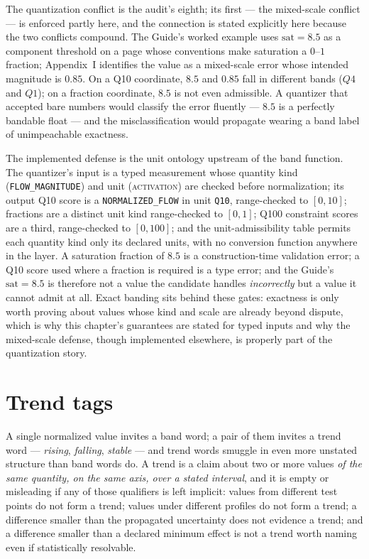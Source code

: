 The quantization conflict is the audit's eighth; its first --- the
mixed-scale conflict --- is enforced partly here, and the connection
is stated explicitly here because the two conflicts compound. The
Guide's worked example uses $\mathrm{sat} = 8.5$ as a component
threshold on a page whose conventions make saturation a $0$--$1$
fraction; Appendix~I identifies the value as a mixed-scale error whose
intended magnitude is $0.85$. On a Q10 coordinate, $8.5$ and $0.85$
fall in different bands ($Q4$ and $Q1$); on a fraction coordinate,
$8.5$ is not even admissible. A quantizer that accepted bare numbers
would classify the error fluently --- $8.5$ is a perfectly bandable
float --- and the misclassification would propagate wearing a band
label of unimpeachable exactness.

The implemented defense is the unit ontology upstream of the band
function. The quantizer's input is a typed measurement whose quantity
kind (\texttt{FLOW\_MAGNITUDE}) and unit (\textsc{activation}) are
checked before normalization; its output Q10 score is a
\texttt{NORMALIZED\_FLOW} in unit \texttt{Q10}, range-checked to
$[0, 10]$; fractions are a distinct unit kind range-checked to
$[0, 1]$; Q100 constraint scores are a third, range-checked to
$[0, 100]$; and the unit-admissibility table permits each quantity kind
only its declared units, with no conversion function anywhere in the
layer. A saturation fraction of $8.5$ is a construction-time validation
error; a Q10 score used where a fraction is required is a type error;
and the Guide's $\mathrm{sat}=8.5$ is therefore not a value the
candidate handles \emph{incorrectly} but a value it cannot admit at
all. Exact banding sits behind these gates: exactness is only worth
proving about values whose kind and scale are already beyond dispute,
which is why this chapter's guarantees are stated for typed inputs and
why the mixed-scale defense, though implemented elsewhere, is properly
part of the quantization story.

\section{Trend tags}\label{ch08:sec:trend}

A single normalized value invites a band word; a pair of them invites a
trend word --- \emph{rising}, \emph{falling}, \emph{stable} --- and trend
words smuggle in even more unstated structure than band words do. A trend
is a claim about two or more values \emph{of the same quantity, on the
same axis, over a stated interval}, and it is empty or misleading if any
of those qualifiers is left implicit: values from different test points do
not form a trend; values under different profiles do not form a trend;
a difference smaller than the propagated uncertainty does not evidence a
trend; and a difference smaller than a declared minimum effect is not a
trend worth naming even if statistically resolvable.

